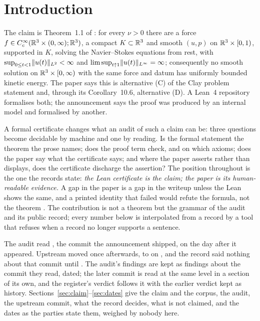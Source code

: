 \documentclass[11pt]{article}
\newcommand{\lean}[1]{\texttt{#1}}
\newcommand{\Lp}[1]{L^{#1}}
\begin{document}
\section{Introduction}

The claim is Theorem~1.1 of \cite{OAINS}: for every $\nu>0$ there are a force
$f\in C_c^\infty(\mathbb{R}^3\times(0,\infty);\mathbb{R}^3)$, a compact $K\subset\mathbb{R}^3$ and smooth $(u,p)$
on $\mathbb{R}^3\times[0,1)$, supported in $K$, solving the Navier--Stokes equations from rest, with
$\sup_{0\le t<1}\norm{u(t)}_{\Lp2}<\infty$ and $\limsup_{t\uparrow1}\norm{u(t)}_{\Lp\infty}
=\infty$; consequently no smooth solution on $\mathbb{R}^3\times[0,\infty)$ with the same force and
datum has uniformly bounded kinetic energy. The paper says this is alternative (C) of the
Clay problem statement \cite{Fef00} and, through its Corollary~10.6, alternative (D). A
Lean~4 repository \cite{OAIrepo} formalises both; the announcement \cite{OAIann} says the
proof was produced by an internal model and formalised by another.

A formal certificate changes what an audit of such a claim can be: three questions become
decidable by machine and one by reading. Is the formal statement the theorem the prose
names; does the proof term check, and on which axioms; does the paper say what the
certificate says; and where the paper asserts rather than displays, does the certificate
discharge the assertion? The position throughout is the one the records state: \emph{the
Lean certificate is the claim; the paper is its human-readable evidence.} A gap in the paper
is a gap in the writeup unless the Lean shows the same, and a printed identity that failed
would refute the formula, not the theorem \cite{Records}. The contribution is not a theorem
but the grammar of the audit and its public record; every number below is interpolated from
a record by a tool that refuses when a record no longer supports a sentence.

The audit read \lean{\LeanCommit}, the commit the announcement shipped, on the day after it
appeared. Upstream moved once afterwards, to \lean{\UpCommit} on \UpCommitDate, and the
record said nothing about that commit until \UpReadOn. The audit's findings are kept as
findings about the commit they read, dated; the later commit is read at the same level in a
section of its own, and the register's verdict follows it with the earlier verdict kept as
history. Sections~\ref{sec:claim}--\ref{sec:dates} give the claim and the corpus, the audit,
the upstream commit, what the record decides, what is not claimed, and the dates as the
parties state them, weighed by nobody here.
\end{document}
